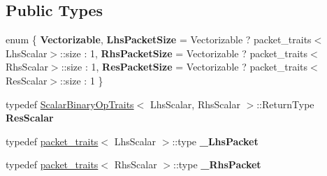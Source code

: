 \subsection*{Public Types}
\begin{DoxyCompactItemize}
\item 
\mbox{\label{struct_eigen_1_1internal_1_1general__matrix__vector__product_3_01_index_00_01_lhs_scalar_00_01_l2767aff966c7bf3a7d425c9d340a95e8_a89ba1e2f9f697309bf363e5921ee17eb}} 
enum \{ {\bfseries Vectorizable}, 
{\bfseries Lhs\+Packet\+Size} = Vectorizable ? packet\+\_\+traits$<$Lhs\+Scalar$>$\+::size \+: 1, 
{\bfseries Rhs\+Packet\+Size} = Vectorizable ? packet\+\_\+traits$<$Rhs\+Scalar$>$\+::size \+: 1, 
{\bfseries Res\+Packet\+Size} = Vectorizable ? packet\+\_\+traits$<$Res\+Scalar$>$\+::size \+: 1
 \}
\item 
\mbox{\label{struct_eigen_1_1internal_1_1general__matrix__vector__product_3_01_index_00_01_lhs_scalar_00_01_l2767aff966c7bf3a7d425c9d340a95e8_a178e003185e9a41da1b5974a8a6e7464}} 
typedef \mbox{\hyperlink{struct_eigen_1_1_scalar_binary_op_traits}{Scalar\+Binary\+Op\+Traits}}$<$ Lhs\+Scalar, Rhs\+Scalar $>$\+::Return\+Type {\bfseries Res\+Scalar}
\item 
\mbox{\label{struct_eigen_1_1internal_1_1general__matrix__vector__product_3_01_index_00_01_lhs_scalar_00_01_l2767aff966c7bf3a7d425c9d340a95e8_af21d304a208837bfba3549cbc01773cb}} 
typedef \mbox{\hyperlink{struct_eigen_1_1internal_1_1packet__traits}{packet\+\_\+traits}}$<$ Lhs\+Scalar $>$\+::type {\bfseries \+\_\+\+Lhs\+Packet}
\item 
\mbox{\label{struct_eigen_1_1internal_1_1general__matrix__vector__product_3_01_index_00_01_lhs_scalar_00_01_l2767aff966c7bf3a7d425c9d340a95e8_ad65ecb1466a4bbfbb8d26d90029ab7cc}} 
typedef \mbox{\hyperlink{struct_eigen_1_1internal_1_1packet__traits}{packet\+\_\+traits}}$<$ Rhs\+Scalar $>$\+::type {\bfseries \+\_\+\+Rhs\+Packet}

\end{DoxyCompactItemize}

